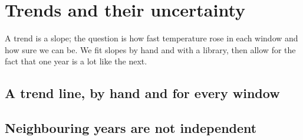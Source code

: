 \chapter{Trends and their uncertainty}\label{ch:trends}
A trend is a slope; the question is how fast temperature rose in each window and how sure we can be. We fit slopes by hand and with a library, then allow for the fact that one year is a lot like the next.

\section{A trend line, by hand and for every window}

\section{Neighbouring years are not independent}


